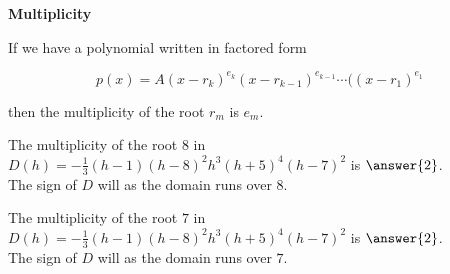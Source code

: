 \documentclass{ximera}
\author{Lee Wayand}
\begin{document}
\begin{exercise}






\begin{idea} \textbf{\textcolor{blue!55!black}{Multiplicity}}


If we have a polynomial written in factored form

\[
p(x) = A (x-r_k)^{e_k} (x-r_{k-1})^{e_{k-1}}  \cdots ((x-r_1)^{e_1}
\]

then the multiplicity of the root $r_m$ is $e_m$. \\





\end{idea}






\begin{question}



The multiplicity of the root $8$ in $D(h) = -\frac{1}{3} (h - 1) (h - 8)^2 h^3 (h + 5)^4 (h - 7)^2$ is $\answer{2}$. \\



The sign of $D$ will  as the domain runs over $8$.




\end{question}











\begin{question}



The multiplicity of the root $7$ in $D(h) = -\frac{1}{3} (h - 1) (h - 8)^2 h^3 (h + 5)^4 (h - 7)^2$ is $\answer{2}$. \\



The sign of $D$ will  as the domain runs over $7$.




\end{question}













\end{exercise}
\end{document}
